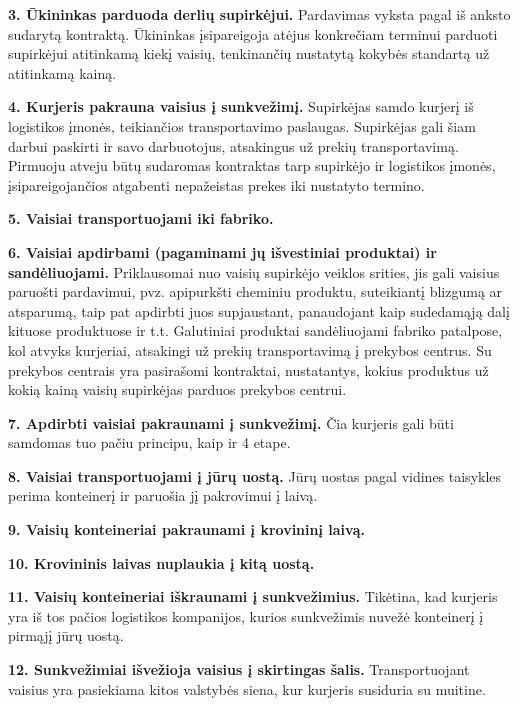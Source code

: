 \medskip \noindent \textbf{3. Ūkininkas parduoda derlių supirkėjui.} Pardavimas vyksta pagal iš anksto sudarytą kontraktą. Ūkininkas įsipareigoja atėjus konkrečiam terminui parduoti supirkėjui atitinkamą kiekį vaisių, tenkinančių nustatytą kokybės standartą už atitinkamą kainą.

\medskip \noindent \textbf{4. Kurjeris pakrauna vaisius į sunkvežimį.} Supirkėjas samdo kurjerį iš logistikos įmonės, teikiančios transportavimo paslaugas. Supirkėjas gali šiam darbui paskirti ir savo darbuotojus, atsakingus už prekių transportavimą. Pirmuoju atveju būtų sudaromas kontraktas tarp supirkėjo ir logistikos įmonės, įsipareigojančios atgabenti nepažeistas prekes iki nustatyto termino.

\medskip \noindent \textbf{5. Vaisiai transportuojami iki fabriko.}

\medskip \noindent \textbf{6. Vaisiai apdirbami (pagaminami jų išvestiniai produktai) ir sandėliuojami.} Priklausomai nuo vaisių supirkėjo veiklos srities, jis gali vaisius paruošti pardavimui, pvz. apipurkšti cheminiu produktu, suteikiantį blizgumą ar atsparumą, taip pat apdirbti juos supjaustant, panaudojant kaip sudedamąją dalį kituose produktuose ir t.t. Galutiniai produktai sandėliuojami fabriko patalpose, kol atvyks kurjeriai, atsakingi už prekių transportavimą į prekybos centrus. Su prekybos centrais yra pasirašomi kontraktai, nustatantys, kokius produktus už kokią kainą vaisių supirkėjas parduos prekybos centrui.

\medskip \noindent \textbf{7. Apdirbti vaisiai pakraunami į sunkvežimį.} Čia kurjeris gali būti samdomas tuo pačiu principu, kaip ir 4 etape.

\medskip \noindent \textbf{8. Vaisiai transportuojami į jūrų uostą.} Jūrų uostas pagal vidines taisykles perima konteinerį ir paruošia jį pakrovimui į laivą.

\medskip \noindent \textbf{9. Vaisių konteineriai pakraunami į krovininį laivą.}

\medskip \noindent \textbf{10. Krovininis laivas nuplaukia į kitą uostą.}

\medskip \noindent \textbf{11. Vaisių konteineriai iškraunami į sunkvežimius.} Tikėtina, kad kurjeris yra iš tos pačios logistikos kompanijos, kurios sunkvežimis nuvežė konteinerį į pirmąjį jūrų uostą.

\medskip \noindent \textbf{12. Sunkvežimiai išvežioja vaisius į skirtingas šalis.} Transportuojant vaisius yra pasiekiama kitos valstybės siena, kur kurjeris susiduria su muitine.

